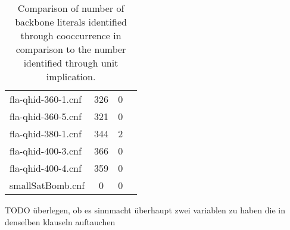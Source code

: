 \begin{wraptable}{r}{7cm}
\begin{tabular}{l| c c c }
fla-qhid-360-1.cnf & 326 & 0 \\
fla-qhid-360-5.cnf & 321 & 0 \\
fla-qhid-380-1.cnf & 344 & 2 \\
fla-qhid-400-3.cnf & 366 & 0 \\
fla-qhid-400-4.cnf & 359 & 0 \\
smallSatBomb.cnf & 0 & 0\\
\end{tabular}
\caption{Comparison of number of backbone literals identified through cooccurrence in comparison to the number identified through unit implication.}
\end{wraptable}


TODO überlegen, ob es sinnmacht überhaupt zwei variablen zu haben die in denselben klauseln auftauchen
